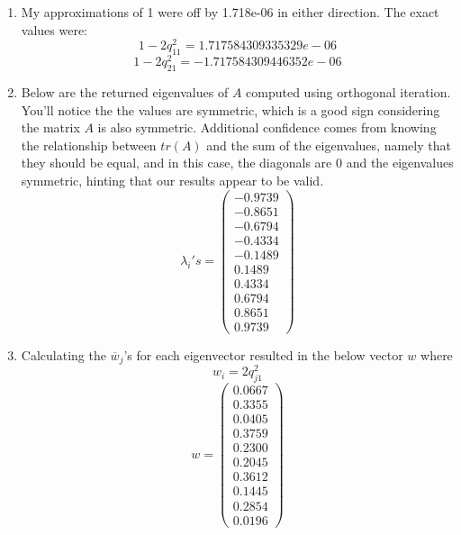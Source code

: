 \documentclass[11pt,a4paper]{article}
\begin{document}
\begin{itemize}
\begin{enumerate} [label={\alph*)}]
\begin{lstlisting}
Q = e;
end
					\end{lstlisting}
					\item My approximations of 1 were off by 1.718e-06 in either direction. The exact values were:
					$$1 - 2q_{11}^2 = 1.717584309335329e-06$$
					$$1 - 2q_{21}^2 = -1.717584309446352e-06$$
					
					
					\item Below are the returned eigenvalues of $A$ computed using orthogonal iteration. You'll notice the the values are symmetric, which is a good sign considering the matrix $A$ is also symmetric. Additional confidence comes from knowing the relationship between $tr(A)$ and the sum of the eigenvalues, namely that they should be equal, and in this case, the diagonals are 0 and the eigenvalues symmetric, hinting that our results appear to be valid.
					$$ \lambda_i 's = 
					\begin{pmatrix}
						 -0.9739 \\
   						-0.8651\\
   						-0.6794\\
  						 -0.4334\\
  						 -0.1489\\
  					 	 0.1489\\
   					 	0.4334\\
    					0.6794\\
    					0.8651\\
    					0.9739
					\end{pmatrix}
					$$
					\item Calculating the $\overline{w}_j$'s for each eigenvector resulted in the below vector $w$ where $$w_i = 2q_{j1}^2$$
					$$ w = 
					\begin{pmatrix}
						0.0667 \\
    					0.3355 \\
    					0.0405 \\
    					0.3759 \\
    					0.2300 \\
    					0.2045 \\
    					0.3612 \\
    					0.1445 \\
    					0.2854 \\
    					0.0196
					\end{pmatrix}
					$$
				\end{enumerate}
					

\end{itemize}
\end{document}
